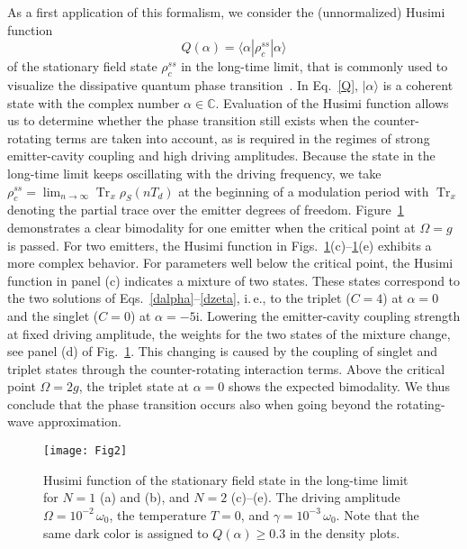 \documentclass[aps,pra,twocolumn,showpacs,showkeys,10pt,nofootinbib]{revtex4-1}
\newcommand{\rmi}{\mathrm i}
\begin{document}
As a first application of this formalism, we consider the (unnormalized) Husimi function
\begin{equation}\label{Q}
  Q(\alpha) = \langle \alpha | \rho_c^{ss} | \alpha \rangle
\end{equation}
of the stationary field state $\rho_c^{ss}$ in the long-time limit, that is commonly used to visualize the dissipative quantum phase transition~\cite{sc88, ac91, car15}.
In Eq.~\eqref{Q}, $|\alpha\rangle$ is a coherent state with the complex number $\alpha\in\mathbb{C}$.
Evaluation of the Husimi function allows us to determine whether the phase transition still exists when the counter-rotating terms are taken into account, as is required in the regimes of strong emitter-cavity coupling and high driving amplitudes.
Because the state in the long-time limit keeps oscillating with the driving frequency, we take $\rho_c^{ss}=\lim_{n\to\infty}\mathop{Tr}_x\rho_S(nT_d)$ at the beginning of a modulation period with $\mathop{Tr}_x$ denoting the partial trace over the emitter degrees of freedom.
Figure~\ref{fig:bistab} demonstrates a clear bimodality for one emitter when the critical point at $\Omega = g$ is passed.
For two emitters, the Husimi function in Figs.~\ref{fig:bistab}(c)--\ref{fig:bistab}(e) exhibits a more complex behavior.
For parameters well below the critical point, the Husimi function in panel (c) indicates a mixture of two states.
These states correspond to the two solutions of Eqs.~\eqref{dalpha}--\eqref{dzeta}, i.\,e., to the triplet ($C=4$) at $\alpha=0$ and the singlet ($C=0$) at $\alpha=-5\rmi$.
Lowering the emitter-cavity coupling strength at fixed driving amplitude, the weights for the two states of the mixture change, see panel (d) of Fig.~\ref{fig:bistab}.
This changing is caused by the coupling of singlet and triplet states through the counter-rotating interaction terms.
Above the critical point $\Omega=2g$, the triplet state at $\alpha=0$ shows the expected bimodality.
We thus conclude that the phase transition occurs also when going beyond the rotating-wave approximation.

\begin{figure}
\texttt{[image: Fig2]}
\caption{\label{fig:bistab}Husimi function of the stationary field state in the long-time limit for $N=1$ (a) and (b), and $N=2$ (c)--(e).
  The driving amplitude $\Omega=10^{-2}\,\omega_0$, the temperature $T=0$, and $\gamma=10^{-3}\,\omega_0$.
  Note that the same dark color is assigned to $Q(\alpha)\geq0.3$ in the density plots.}
\end{figure}
\end{document}
